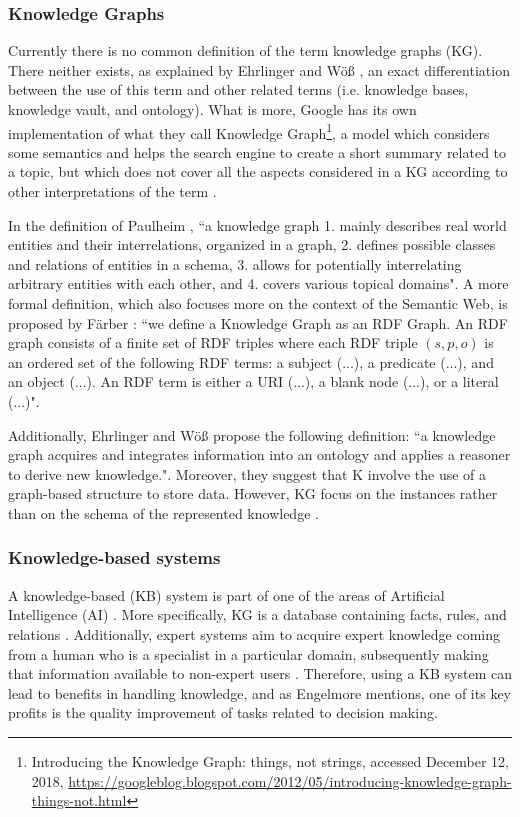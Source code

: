 \documentclass[runningheads]{llncs}
\begin{document}
\subsubsection{Knowledge Graphs} \label{knowledge-graphs}
Currently there is no common definition of the term knowledge graphs
(KG). There neither exists, as explained by Ehrlinger and W{\"o}{\ss}
\cite{Ehrlinger}, an exact differentiation between the use of this term and other related terms (i.e. knowledge bases, knowledge vault, and
ontology). What is more, Google has its own implementation of what they
call Knowledge Graph\footnote{Introducing the Knowledge Graph: things, not strings, accessed December 12, 2018, \href{https://googleblog.blogspot.com/2012/05/introducing-knowledge-graph-things-not.html}
{https://googleblog.blogspot.com/2012/05/introducing-knowledge-graph-things-not.html}}, 
a model which considers some semantics and helps the search engine to create a short summary related to a topic, but which does not cover all
the aspects considered in a KG according to other interpretations of
the term \cite{Ehrlinger}.

In the definition of Paulheim \cite{Paulheim}, ``a knowledge graph
1. mainly describes real world entities and their interrelations, organized in a graph, 2. defines possible classes and relations of entities in a schema, 3. allows for potentially interrelating arbitrary entities with each other, and 4. covers various topical domains". A more formal definition, which also focuses more on the context of the Semantic Web, is proposed by F{\"a}rber \cite{Farber}: ``we define a Knowledge Graph as an RDF Graph. An RDF graph consists of a finite set of RDF triples where each RDF triple $(s, p, o)$ is an ordered set of the following RDF terms: a subject (...), a predicate (...), and an object (...). An RDF term is either a URI (...), a blank node (...), or a literal (...)".

Additionally, Ehrlinger and W{\"o}{\ss} \cite{Ehrlinger} propose the following definition: ``a knowledge graph acquires and integrates information into an ontology and applies a reasoner to derive new knowledge.". Moreover, they suggest that K involve the use of a graph-based structure to store data. However, KG focus on the instances rather than on the schema of the represented knowledge \cite{Paulheim}.


\subsubsection{Knowledge-based systems} \label{knowledge-based}
A knowledge-based (KB) system is part of one of the areas of Artificial Intelligence (AI) \cite{Tripathi}. More specifically, KG is a database containing facts, rules, and relations \cite{Engelmore}. Additionally, expert systems aim to acquire expert knowledge coming from a human who is a specialist in a particular domain, subsequently making that information available to non-expert users \cite{Tripathi}.
Therefore, using a KB system can lead to benefits in handling knowledge, and as Engelmore \cite{Engelmore} mentions, one of its key profits is the quality improvement of tasks related to decision making.
\end{document}
